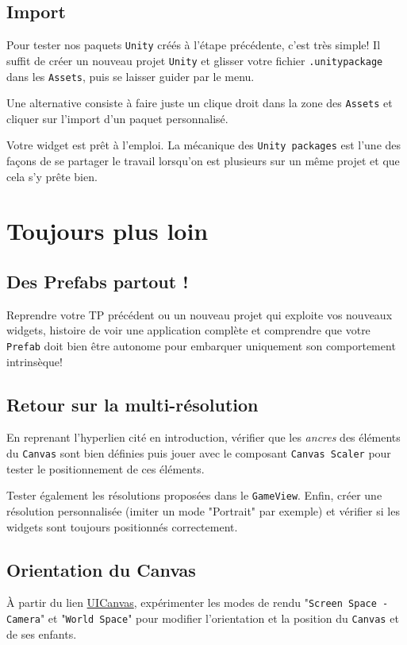 \documentclass[a4paper,10pt]{article}
\newenvironment{info}%
{\begin{tcolorbox}[breakable,colback=green!5!white,colframe=green!75!black,title=Information]}%
{\end{tcolorbox}}
\begin{document}
\subsection{Import}

Pour tester nos paquets \texttt{Unity} créés à l'étape précédente, c'est très simple! Il suffit de créer un nouveau projet \texttt{Unity} et glisser votre fichier \texttt{.unitypackage} dans les \texttt{Assets}, puis se laisser guider par le menu.

\begin{info}
Une alternative consiste  à faire juste un clique droit dans la zone des \texttt{Assets} et cliquer sur l'import d'un paquet personnalisé.
\end{info}

Votre widget est prêt à l'emploi. La mécanique des \texttt{Unity packages} est l'une des façons de se partager le travail lorsqu'on est plusieurs sur un même projet et que cela s'y prête bien. 

\section{Toujours plus loin}

\subsection{Des Prefabs partout !}
Reprendre votre TP précédent ou un nouveau projet qui exploite vos nouveaux widgets, histoire de voir une application complète et comprendre que votre \texttt{Prefab} doit bien être autonome pour embarquer uniquement son comportement intrinsèque!

\subsection{Retour sur la multi-résolution}
En reprenant l'hyperlien cité en introduction, vérifier que les \textit{ancres} des éléments du \texttt{Canvas} sont bien définies puis jouer avec le composant \texttt{Canvas Scaler} pour tester le positionnement de ces éléments. 

Tester également les résolutions proposées dans le \texttt{GameView}. Enfin, créer une résolution personnalisée (imiter un mode "Portrait" par exemple) et vérifier si les widgets sont toujours positionnés correctement.

\subsection{Orientation du Canvas}
À partir du lien \href{https://docs.unity3d.com/2020.1/Documentation/Manual/UICanvas.html}{UICanvas}, expérimenter les modes de rendu "\texttt{Screen Space - Camera}" et "\texttt{World Space}" pour modifier l'orientation et la position du \texttt{Canvas} et de ses enfants.
\end{document}
